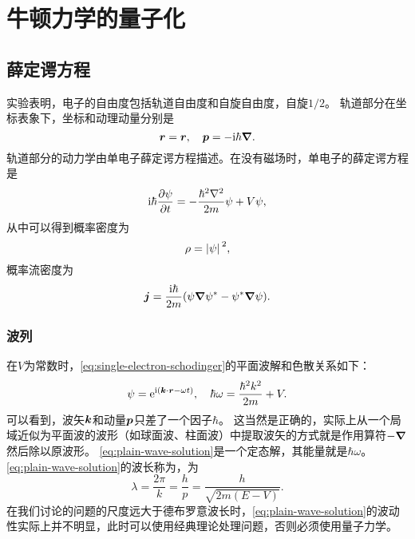 \chapter{牛顿力学的量子化}

\section{薛定谔方程}

实验表明，电子的自由度包括轨道自由度和自旋自由度，自旋$1/2$。
轨道部分在坐标表象下，坐标和动理动量分别是
\begin{equation}
    {\vb*{r}} = \vb*{r}, \quad {\vb*{p}} = -\mathrm{i} \hbar \grad.
    \label{eq:single-electron-schodinger}
\end{equation}
轨道部分的动力学由单电子薛定谔方程描述。在没有磁场时，单电子的薛定谔方程是
\begin{equation}
    \ii \hbar \pdv{\psi}{t} = - \frac{\hbar^2 \laplacian}{2m} \psi + V \psi,
\end{equation}
从中可以得到概率密度为
\begin{equation}
    \rho = \abs*{\psi}^2,
\end{equation}
概率流密度为
\begin{equation}
    \vb*{j} = \frac{\mathrm{i} \hbar}{2m} (\psi \grad{\psi^*} - \psi^* \grad{\psi}).
\end{equation}

\subsection{波列}

在$V$为常数时，\eqref{eq:single-electron-schodinger}的平面波解和色散关系如下：
\begin{equation}
    \psi = \mathrm{e}^{\mathrm{i}(\vb*{k} \cdot \vb*{r} - \omega t)}, \quad \hbar \omega = \frac{\hbar^2 k^2}{2m} + V.
    \label{eq:plain-wave-solution}
\end{equation}
可以看到，波矢$\vb*{k}$和动量$\vb*{p}$只差了一个因子$\hbar$。
这当然是正确的，实际上从一个局域近似为平面波的波形（如球面波、柱面波）中提取波矢的方式就是作用算符$-\grad$然后除以原波形。
\eqref{eq:plain-wave-solution}是一个定态解，其能量就是$\hbar \omega$。
\eqref{eq:plain-wave-solution}的波长称为，为
\begin{equation}
    \lambda = \frac{2\pi}{k} = \frac{h}{p} = \frac{h}{\sqrt{2m(E-V)}}.
\end{equation}
在我们讨论的问题的尺度远大于德布罗意波长时，\eqref{eq:plain-wave-solution}的波动性实际上并不明显，此时可以使用经典理论处理问题，否则必须使用量子力学。

